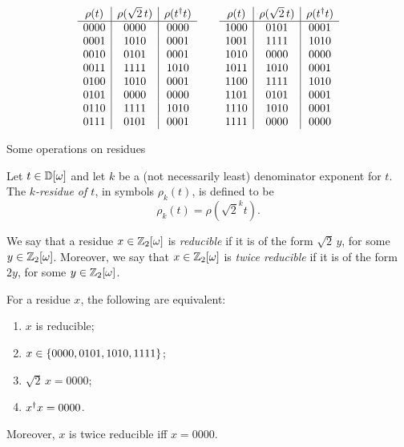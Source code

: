 \begin{table}
  \[ \begin{array}{c|c|c} \rho(t) & \rho(\sqrt{2}\,t) & \rho(t^{\dagger} t)\\\hline
    0000 & 0000 & 0000 \\
    0001 & 1010 & 0001 \\
    0010 & 0101 & 0001 \\
    0011 & 1111 & 1010 \\

    0100 & 1010 & 0001 \\
    0101 & 0000 & 0000 \\
    0110 & 1111 & 1010 \\
    0111 & 0101 & 0001 \\
  \end{array}\qquad
  \begin{array}{c|c|c} \rho(t) & \rho(\sqrt{2}\,t) & \rho(t^{\dagger} t)\\\hline
    1000 & 0101 & 0001 \\
    1001 & 1111 & 1010 \\
    1010 & 0000 & 0000 \\
    1011 & 1010 & 0001 \\

    1100 & 1111 & 1010 \\
    1101 & 0101 & 0001 \\
    1110 & 1010 & 0001 \\
    1111 & 0000 & 0000 \\
  \end{array}
  \]
  \caption{Some operations on residues}\label{tab-residue}
\end{table}

\begin{definition}[$k$-Residue]
  Let $t\in\mathbb{D}[\omega]$ and let $k$ be a (not necessarily least) denominator exponent for $t$. The {\em
  $k$-residue of $t$}, in symbols $\rho_k(t)$, is defined to be
  \[ 
    \rho_k(t) = \rho(\sqrt{2}^k t).
  \]
\end{definition}

\begin{definition}[Reducibility]
  We say that a residue $x\in\mathbb{Z}_2[\omega]$ is {\em reducible} if it is of the form $\sqrt{2}\,y$, for some
  $y\in\mathbb{Z}_2[\omega]$. Moreover, we say that $x\in\mathbb{Z}_2[\omega]$ is {\em twice reducible} if it is of the form $2y$,
  for some $y\in\mathbb{Z}_2[\omega]$.
\end{definition}

\begin{lemma}\label{lem-reducible}
  For a residue $x$, the following are equivalent:
  \begin{enumerate}\alphalabels
    \item $x$ is reducible;
    \item $x\in\{0000,0101,1010,1111\}$;
    \item $\sqrt{2}\,x = 0000$;
    \item $x^{\dagger} x=0000$.
  \end{enumerate}
  Moreover, $x$ is twice reducible iff $x=0000$.
\end{lemma}

